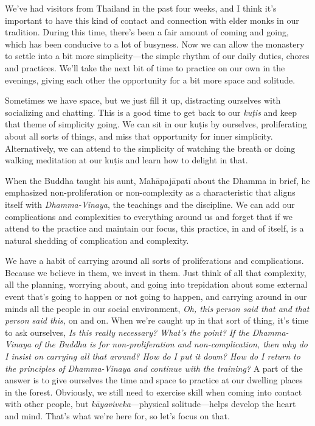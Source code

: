 
We've had visitors from Thailand in the past four weeks, and I think 
it's important to have this kind of contact and connection with elder 
monks in our tradition. During this time, there's been a fair amount of 
coming and going, which has been conducive to a lot of busyness. Now we 
can allow the monastery to settle into a bit more simplicity---the 
simple rhythm of our daily duties, chores and practices. We'll take the 
next bit of time to practice on our own in the evenings, giving each 
other the opportunity for a bit more space and solitude.

Sometimes we have space, but we just fill it up, distracting ourselves 
with socializing and chatting. This is a good time to get back to our 
\emph{kuṭis} and keep that theme of simplicity going. We can sit in 
our kuṭis by ourselves, proliferating about all sorts of things, and 
miss that opportunity for inner simplicity. Alternatively, we can 
attend to the simplicity of watching the breath or doing walking 
meditation at our kuṭis and learn how to delight in that.

When the Buddha taught his aunt, Mahāpajāpatī about the Dhamma in 
brief, he emphasized non-proliferation or non-complexity as a 
characteristic that aligns itself with \emph{Dhamma-Vinaya}, the 
teachings and the discipline. We can add our complications and 
complexities to everything around us and forget that if we attend to 
the practice and maintain our focus, this practice, in and of itself, 
is a natural shedding of complication and complexity.

We have a habit of carrying around all sorts of proliferations and 
complications. Because we believe in them, we invest in them. Just 
think of all that complexity, all the planning, worrying about, and 
going into trepidation about some external event that's going to happen 
or not going to happen, and carrying around in our minds all the people 
in our social environment, \emph{Oh, this person said that and that 
person said this,} on and on. When we're caught up in that sort of 
thing, it's time to ask ourselves, \emph{Is this really necessary? 
What's the point?} \emph{If the Dhamma-Vinaya of the Buddha is for 
non-proliferation and non-complication, then why do I insist on 
carrying all that around? How do I put it down? How do I return to the 
principles of Dhamma-Vinaya and continue with the training?} A part of 
the answer is to give ourselves the time and space to practice at our 
dwelling places in the forest. Obviously, we still need to exercise 
skill when coming into contact with other people, but 
\emph{kāyaviveka}---physical solitude---helps develop the heart and 
mind. That's what we're here for, so let's focus on that.

